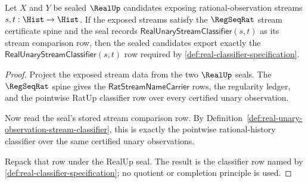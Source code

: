 \begin{theorem}
\label{thm:regseqrat-realup-seal-consumes-stream-spine}
Let $X$ and $Y$ be sealed $\RealUp$ candidates exposing rational-observation
streams $s,t:\Hist\to\Hist$. If the exposed streams satisfy the
$\RegSeqRat$ stream certificate spine and the seal records
$\mathsf{RealUnaryStreamClassifier}(s,t)$ as its stream comparison row, then
the sealed candidates export exactly the
$\mathsf{RealUnaryStreamClassifier}(s,t)$ row required by
\autoref{def:real-classifier-specification}.
\end{theorem}
\begin{proof}
Project the exposed stream data from the two $\RealUp$ seals. The
$\RegSeqRat$ spine gives the $\mathsf{RatStreamNameCarrier}$ rows, the
regularity ledger, and the pointwise RatUp classifier row over every certified
unary observation.

Now read the seal's stored stream comparison row. By
Definition~\ref{def:real-unary-observation-stream-classifier}, this is exactly
the pointwise rational-history classifier over the same certified unary
observations.

Repack that row under the RealUp seal. The result is the classifier row named
by \autoref{def:real-classifier-specification}; no quotient or completion
principle is used.
\end{proof}

